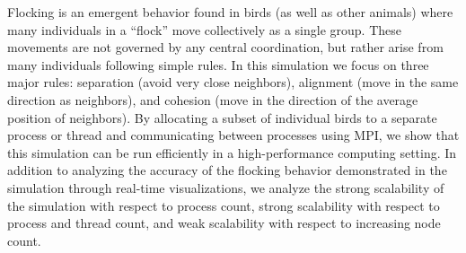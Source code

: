 Flocking is an emergent behavior found in birds (as well as other
animals) where many individuals in a “flock” move collectively as a
single group. These movements are not governed by any central
coordination, but rather arise from many individuals following simple
rules. In this simulation we focus on three major rules: separation
(avoid very close neighbors), alignment (move in the same direction as
neighbors), and cohesion (move in the direction of the average
position of neighbors). By allocating a subset of individual birds to
a separate process or thread and communicating between processes using
MPI, we show that this simulation can be run efficiently in a
high-performance computing setting. In addition to analyzing the
accuracy of the flocking behavior demonstrated in the simulation
through real-time visualizations, we analyze the strong scalability of
the simulation with respect to process count, strong scalability with
respect to process and thread count, and weak scalability with respect to
increasing node count.
